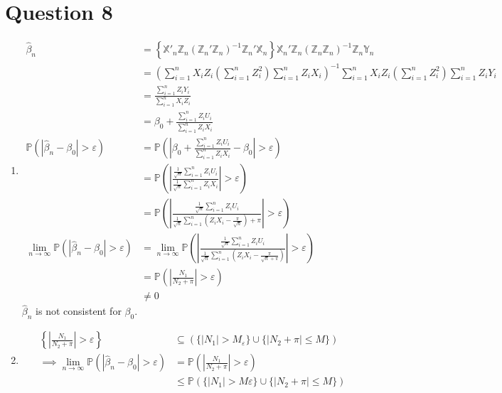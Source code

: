 \documentclass[11pt]{article}
\newcommand{\p}{\mathbb{P}}
\newcommand{\X}{\mathbb{X}}
\newcommand{\Y}{\mathbb{Y}}
\newcommand{\Z}{\mathbb{Z}}
\begin{document}
\section{Question 8}
\label{sec:org5c257b3}
 \begin{enumerate}[label=\alph*)]
\item 
\begin{align*}
\hat{\beta}_n &= \left\{\X'_n \Z_n (\Z_n'\Z_n)^{-1} \Z_n'\X_n\right\}\X_n'\Z_n(\Z_n \Z_n)^{-1}\Z_n\Y_n\\
&= \left(\sum^n_{i = 1} X_i Z_i \left(\sum^n_{i = 1} Z_i^2\right)\sum^n_{i = 1} Z_i X_i\right)^{-1} \sum^n_{i = 1} X_i Z_i \left(\sum^n_{i = 1} Z_i^2\right)\sum^n_{i = 1} Z_i Y_i\\
&= \frac{\sum^n_{i =1}Z_i Y_i}{\sum^n_{i = 1}X_i Z_i}\\
&= \beta_0 + \frac{\sum^n_{i  = 1} Z_i U_i}{\sum^n_{i = 1} Z_i X_i}\\
\p(|\hat{\beta}_n - \beta_0| > \varepsilon) &= \p \left(\left|\beta_0 + \frac{\sum^n_{i = 1}Z_i U_i}{\sum^n_{i  =1} Z_i X_i} - \beta_0 \right| > \varepsilon \right)\\
&= \p \left(\left|\frac{\frac{1}{\sqrt{n}}\sum^n_{i = 1}Z_i U_i}{\frac{1}{\sqrt{n}}\sum^n_{i  =1} Z_i X_i}\right| > \varepsilon \right)\\
&= \p \left(\left|\frac{\frac{1}{\sqrt{n}} \sum^n_{i = 1} Z_i U_i}{\frac{1}{\sqrt{n}} \sum^n_{i = 1} (Z_i X_i - \frac{\pi}{\sqrt{n}}) + \pi}\right| > \varepsilon \right)\\
\lim_{n \to \infty} \p (|\hat{\beta}_n - \beta_0| > \varepsilon) & = \lim_{n \to \infty} \p \left(\left|\frac{\frac{1}{\sqrt{n}} \sum^n_{i = 1}Z_i U_i}{\frac{1}{\sqrt{n}} \sum^n_{i = 1} (Z_i X_i - \frac{\pi}{\sqrt{n} + \pi})}\right| > \varepsilon \right) \tag{CLT}\\
&= \p \left(\left|\frac{N_1}{N_2 + \pi}\right| > \varepsilon \right)\\
&\ne 0
\end{align*}
$\hat{\beta}_n$ is not consistent for $\beta_0$.
\item
\begin{align*}
\left\{\left|\frac{N_1}{N_2 + \pi}\right| > \varepsilon\right\} &\subseteq \left(\{|N_1| > M_\varepsilon\} \cup \{|N_2 + \pi| \le M\}\right)\\
\implies \lim_{n \to \infty} \p (|\hat{\beta}_n - \beta_0| > \varepsilon) & = \p \left(\left|\frac{N_1}{N_2 + \pi}\right| > \varepsilon\right)\\
&\le \p\left(\{|N_1| > M \varepsilon\} \cup \{|N_2 + \pi| \le M\}\right)\\

\end{align*}
\end{enumerate}
\end{document}
